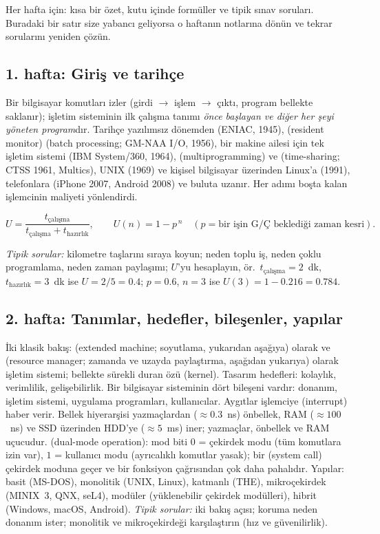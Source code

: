 Her hafta için: kısa bir özet, kutu içinde formüller ve tipik sınav soruları. Buradaki bir satır size yabancı geliyorsa o haftanın notlarına dönün ve tekrar sorularını yeniden çözün.

\subsection{1. hafta: Giriş ve tarihçe}
Bir bilgisayar komutları izler (girdi $\to$ işlem $\to$ çıktı, program bellekte saklanır); işletim sisteminin ilk çalışma tanımı \emph{önce başlayan ve diğer her şeyi yöneten program}dır. Tarihçe yazılımsız dönemden (ENIAC, 1945),  (resident monitor)  (batch processing; GM-NAA I/O, 1956), bir makine ailesi için tek işletim sistemi (IBM System/360, 1964),  (multiprogramming) ve  (time-sharing; CTSS 1961, Multics), UNIX (1969) ve kişisel bilgisayar üzerinden Linux'a (1991), telefonlara (iPhone 2007, Android 2008) ve buluta uzanır. Her adımı boşta kalan işlemcinin maliyeti yönlendirdi.
\begin{example}
\[
U = \frac{t_{\text{çalışma}}}{t_{\text{çalışma}} + t_{\text{hazırlık}}}, \qquad U(n) = 1 - p^{\,n}\quad(p = \text{bir işin G/Ç beklediği zaman kesri}).
\]
\end{example}
\textit{Tipik sorular:} kilometre taşlarını sıraya koyun; neden toplu iş, neden çoklu programlama, neden zaman paylaşımı; $U$'yu hesaplayın, ör.\ $t_{\text{çalışma}} = 2$~dk, $t_{\text{hazırlık}} = 3$~dk ise $U = 2/5 = 0.4$; $p = 0.6$, $n=3$ ise $U(3) = 1 - 0.216 = 0.784$.

\subsection{2. hafta: Tanımlar, hedefler, bileşenler, yapılar}
İki klasik bakış:  (extended machine; soyutlama, yukarıdan aşağıya) olarak ve  (resource manager; zamanda ve uzayda paylaştırma, aşağıdan yukarıya) olarak işletim sistemi; bellekte sürekli duran özü  (kernel). Tasarım hedefleri: kolaylık, verimlilik, gelişebilirlik. Bir bilgisayar sisteminin dört bileşeni vardır: donanım, işletim sistemi, uygulama programları, kullanıcılar. Aygıtlar işlemciye  (interrupt) haber verir. Bellek hiyerarşisi yazmaçlardan ($\approx 0.3$~ns) önbellek, RAM ($\approx 100$~ns) ve SSD üzerinden HDD'ye ($\approx 5$~ms) iner; yazmaçlar, önbellek ve RAM uçucudur.  (dual-mode operation): mod biti $0$ = çekirdek modu (tüm komutlara izin var), $1$ = kullanıcı modu (ayrıcalıklı komutlar yasak); bir  (system call) çekirdek moduna geçer ve bir fonksiyon çağrısından çok daha pahalıdır. Yapılar: basit (MS-DOS), monolitik (UNIX, Linux), katmanlı (THE), mikroçekirdek (MINIX~3, QNX, seL4), modüler (yüklenebilir çekirdek modülleri), hibrit (Windows, macOS, Android).
\textit{Tipik sorular:} iki bakış açısı; koruma neden donanım ister; monolitik ve mikroçekirdeği karşılaştırın (hız ve güvenilirlik).

